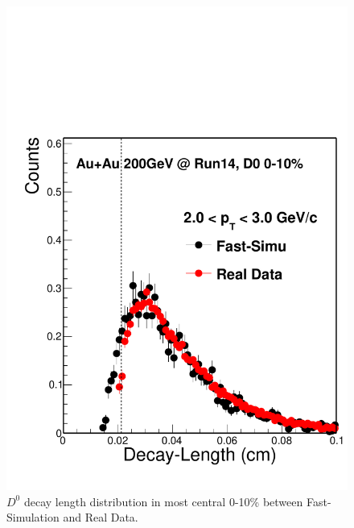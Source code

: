 \begin{figure}[htbp]
\begin{minipage}[htbp]{0.52\linewidth}
\includegraphics[width=1.0\textwidth,angle=0]{figure/Run14_D0HFT/DecayL.pdf} 
\caption{ $D^0$ decay length distribution in most central 0-10\% between Fast-Simulation and Real Data.\label{DecayL}}
\end{minipage}
\end{figure}

